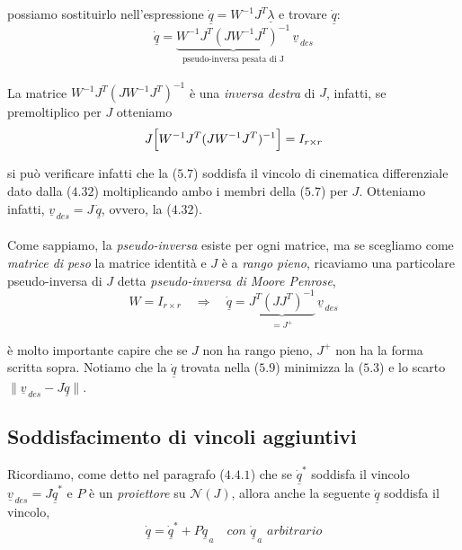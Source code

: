 possiamo sostituirlo nell'espressione $\underline{\dot{q}} = W^{-1}J^T \underline{\lambda}$ e trovare $\underline{\dot{q}}$:
\begin{equation}
	\underline{\dot{q}} = \underbrace{W^{-1}J^T(JW^{-1}J^T)^{-1}}_{\text{pseudo-inversa pesata di J}}\,\underline{v}_{\,des}
\end{equation}

\paragraph{}
La matrice $W^{-1}J^T(JW^{-1}J^T)^{-1}$ è una \emph{inversa destra} di $J$, infatti, se premoltiplico per $J$ otteniamo
\begin{equation}
	J\Bigl[ W^{-1}J^T(JW^{-1}J^T)^{-1} \Bigr] = I_{r \times r}
\end{equation}

si può verificare infatti che la ($5.7$) soddisfa il vincolo di cinematica differenziale dato dalla ($4.32$) moltiplicando ambo i membri della ($5.7$) per $J$. Otteniamo infatti, $\underline{v}_{\,des} = J\,\underline{\dot{q}}$, ovvero, la ($4.32$).

\paragraph{}
Come sappiamo, la \emph{pseudo-inversa} esiste per ogni matrice, ma se scegliamo come \emph{matrice di peso} la matrice identità e $J$ è a \emph{rango pieno}, ricaviamo una particolare pseudo-inversa di $J$ detta \emph{pseudo-inversa di Moore Penrose},
\begin{equation}
	W = I_{r \times r} \quad \Rightarrow \quad \underline{\dot{q}} = \underbrace{ J^T(JJ^T)^{-1}}_{= J^{+}}\,\underline{v}_{\,des}
\end{equation}

è molto importante capire che se $J$ non ha rango pieno, $J^{+}$ non ha la forma scritta sopra. Notiamo che la $\underline{\dot{q}}$ trovata nella ($5.9$) minimizza la ($5.3$) e lo scarto $\| \underline{v}_{\,des} - J \underline{\dot{q}} \|$.
\newpage

\subsection{Soddisfacimento di vincoli aggiuntivi}
Ricordiamo, come detto nel paragrafo ($4.4.1$) che se $\underline{\dot{q}}^*$ soddisfa il vincolo $\underline{v}_{\,des} = J\underline{\dot{q}}^*$ e $P$ è un \emph{proiettore} su $\mathcal{N}(J)$, allora anche la seguente $\underline{\dot{q}}$ soddisfa il vincolo,
\begin{equation}
	\underline{\dot{q}} = \underline{\dot{q}}^* + P\underline{\dot{q}}_{\,a} \quad \textit{con $\underline{\dot{q}}_{\,a}$ arbitrario}
\end{equation}
